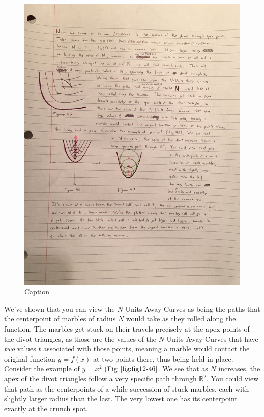 \begin{figure}
  \includegraphics[width=.9\linewidth]{solving-divot-paths-img/Fig 12-45.png}
  \caption{Caption}
  \label{fig:fig12-45}
\end{figure}

We've shown that you can view the $N$-Units Away Curves as being the paths that the centerpoint of marbles of radius $N$ would take as they rolled along the function. The marbles get stuck on their travels precisely at the apex points of the divot triangles, as those are the values of the $N$-Units Away Curves that have \textit{two} values $t$ associated with those points, meaning a marble would contact the original function $y = f(x)$ at two points there, thus being held in place. Consider the example of $y = x^2$ (Fig $\ref{fig:fig12-46}$. We see that as $N$ increases, the apex of the divot triangles follow a very specific path through $\mathbb{R}^2$. You could view that path as the centerpoints of a while succession of stuck marbles, each with slightly larger radius than the last. The very lowest one has its centerpoint exactly at the crunch spot.

